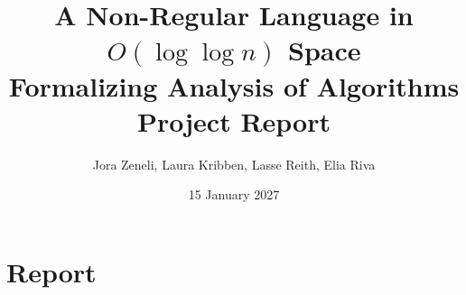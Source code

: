 \documentclass[UTF8]{article}
\begin{document}
\title{
  A Non-Regular Language in $O(\log \log n)$ Space \\
    \large
        Formalizing Analysis of Algorithms \\
        Project Report}

\author{Jora Zeneli, Laura Kribben, Lasse Reith, Elia Riva}

\date{15 January 2027}

\maketitle
\newpage

\section{Report}

\newpage



\end{document}
